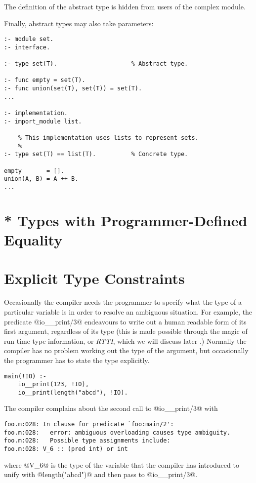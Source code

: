 The definition of the abstract type is hidden from users of
the complex module.

Finally, abstract types may also take parameters:
\begin{verbatim}
:- module set.
:- interface.

:- type set(T).                     % Abstract type.

:- func empty = set(T).
:- func union(set(T), set(T)) = set(T).
...

:- implementation.
:- import_module list.

    % This implementation uses lists to represent sets.
    %
:- type set(T) == list(T).          % Concrete type.

empty       = [].
union(A, B) = A ++ B.
...
\end{verbatim}

\section{* Types with Programmer-Defined Equality}


\section{Explicit Type Constraints}

Occasionally the compiler needs the programmer to specify what the type
of a particular variable is in order to resolve an ambiguous situation.
For example, the predicate @io__print/3@ endeavours to write out a human
readable form of its first argument, regardless of its type (this is
made possible through the magic of run-time type information, or
\emph{RTTI}, which we will discuss later \XXX{}.) Normally the compiler
has no problem working out the type of the argument, but occasionally
the programmer has to state the type explicitly.
\begin{verbatim}
main(!IO) :-
    io__print(123, !IO),
    io__print(length("abcd"), !IO).
\end{verbatim}
The compiler complains about the second call to @io__print/3@
with
\begin{verbatim}
foo.m:028: In clause for predicate `foo:main/2':
foo.m:028:   error: ambiguous overloading causes type ambiguity.
foo.m:028:   Possible type assignments include:
foo.m:028: V_6 :: (pred int) or int
\end{verbatim}
where @V_6@ is the type of the variable that the compiler has
introduced to unify with @length("abcd")@ and then pass to
@io__print/3@.

